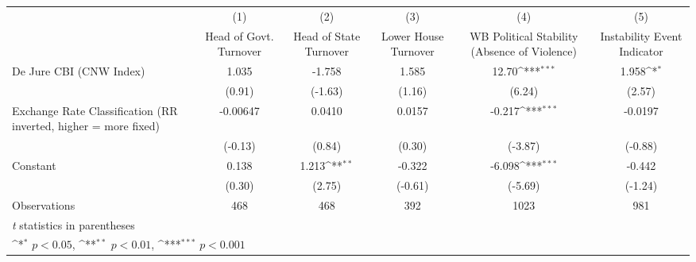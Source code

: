 {
\def\sym#1{\ifmmode^{#1}\else\(^{#1}\)\fi}
\begin{tabular}{l*{5}{c}}
\hline\hline
                &\multicolumn{1}{c}{(1)}&\multicolumn{1}{c}{(2)}&\multicolumn{1}{c}{(3)}&\multicolumn{1}{c}{(4)}&\multicolumn{1}{c}{(5)}\\
                &\multicolumn{1}{c}{Head of Govt. Turnover}&\multicolumn{1}{c}{Head of State Turnover}&\multicolumn{1}{c}{Lower House Turnover}&\multicolumn{1}{c}{WB Political Stability (Absence of Violence)}&\multicolumn{1}{c}{Instability Event Indicator}\\
\hline
De Jure CBI (CNW Index)&    1.035         &   -1.758         &    1.585         &    12.70\sym{***}&    1.958\sym{*}  \\
                &   (0.91)         &  (-1.63)         &   (1.16)         &   (6.24)         &   (2.57)         \\
[1em]
Exchange Rate Classification (RR inverted, higher = more fixed)& -0.00647         &   0.0410         &   0.0157         &   -0.217\sym{***}&  -0.0197         \\
                &  (-0.13)         &   (0.84)         &   (0.30)         &  (-3.87)         &  (-0.88)         \\
[1em]
Constant        &    0.138         &    1.213\sym{**} &   -0.322         &   -6.098\sym{***}&   -0.442         \\
                &   (0.30)         &   (2.75)         &  (-0.61)         &  (-5.69)         &  (-1.24)         \\
\hline
Observations    &      468         &      468         &      392         &     1023         &      981         \\
\hline\hline
\multicolumn{6}{l}{\footnotesize \textit{t} statistics in parentheses}\\
\multicolumn{6}{l}{\footnotesize \sym{*} \(p<0.05\), \sym{**} \(p<0.01\), \sym{***} \(p<0.001\)}\\
\end{tabular}
}
